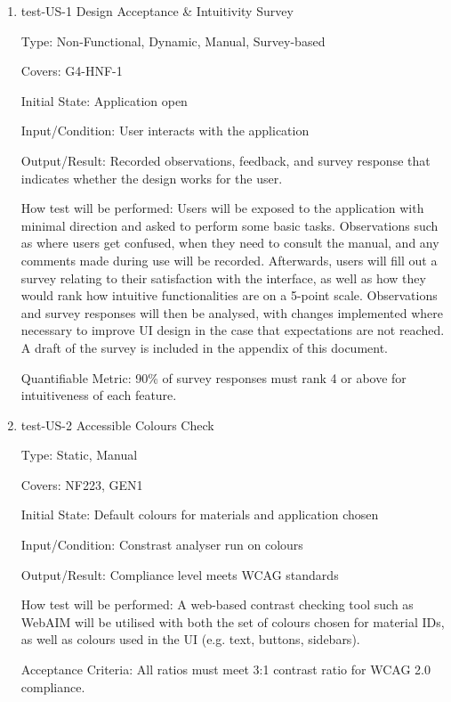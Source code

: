\documentclass[12pt, titlepage]{article}
\begin{document}
\begin{enumerate}

\item{test-US-1 Design Acceptance \& Intuitivity Survey\\}

Type: Non-Functional, Dynamic, Manual, Survey-based

Covers: G4-HNF-1
					
Initial State: Application open
					
Input/Condition: User interacts with the application
					
Output/Result: Recorded observations, feedback, and survey response that indicates whether the design works for the user.
					
How test will be performed: Users will be exposed to the application with minimal direction and asked to perform 
some basic tasks. Observations such as where users get confused, when they need to consult the manual, and any comments
made during use will be recorded. Afterwards, users will fill out a survey relating to their satisfaction with the interface, 
as well as how they would rank how intuitive functionalities are on a 5-point scale. Observations and survey responses will then be analysed, with
changes implemented where necessary to improve UI design in the case that expectations are not reached. A draft of the survey
is included in the appendix of this document.

Quantifiable Metric: 90\% of survey responses must rank 4 or above for intuitiveness of each feature.

\item{test-US-2 Accessible Colours Check\\}

Type: Static, Manual

Covers: NF223, GEN1 %
					
Initial State: Default colours for materials and application chosen
					
Input/Condition: Constrast analyser run on colours
					
Output/Result: Compliance level meets WCAG standards
					
How test will be performed: A web-based contrast checking tool such as WebAIM will be utilised with both the set of colours chosen 
for material IDs, as well as colours used in the UI (e.g. text, buttons, sidebars).

Acceptance Criteria: All ratios must meet 3:1 contrast ratio for WCAG 2.0 compliance.


\end{enumerate}
\end{document}
